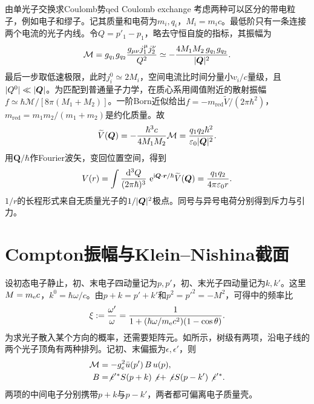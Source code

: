 \begin{example}{由单光子交换求Coulomb势}{qed Coulomb exchange}
    考虑两种可以区分的带电粒子，例如电子和缪子。记其质量和电荷为$m_i,q_i$，$M_i = m_i c$。最低阶只有一条连接两个电流的光子内线。令$Q = p'_1 - p_1$，略去守恒自旋的指标，其振幅为
    \[
        \mathcal M = g_{q_1}g_{q_2}\frac{g_{\mu\nu}j_1^\mu j_2^\nu}{Q^2}
        \simeq -\frac{4M_1M_2\,g_{q_1}g_{q_2}}{\lvert\bm Q\rvert^2}.
    \]
    最后一步取低速极限，此时$j_i^0 \simeq 2M_i$，空间电流比时间分量小$v_i/c$量级，且$|Q^0| \ll \lvert\bm Q\rvert$。为匹配到普通量子力学，在质心系用阈值附近的散射振幅$f \simeq \hbar\mathcal M/[8\pi(M_1 + M_2)]$。一阶Born近似给出$f = -m_\mathrm{red}\widetilde V/(2\pi\hbar^2)$，$m_\mathrm{red} = m_1m_2/(m_1 + m_2)$是约化质量。故
    \[
        \widetilde V(\bm Q) = -\frac{\hbar^3 c}{4M_1M_2}\mathcal M
        = \frac{q_1q_2\hbar^2}{\varepsilon_0\lvert\bm Q\rvert^2}.
    \]
    用$\bm Q/\hbar$作Fourier波矢，变回位置空间，得到
    \[
        V(r) = \int\frac{\mathop{}\!\mathrm{d}^3 Q}{(2\pi\hbar)^3}\,
        \mathop{}\!\mathrm{e}^{\mathrm{i}\bm Q\cdot\bm r/\hbar}\widetilde V(\bm Q)
        = \frac{q_1q_2}{4\pi\varepsilon_0 r}.
    \]
    $1/r$的长程形式来自无质量光子的$1/\lvert\bm Q\rvert^2$极点。同号与异号电荷分别得到斥力与引力。
\end{example}

\section{Compton振幅与Klein--Nishina截面}
\label{sec:qed Compton}

设初态电子静止，初、末电子四动量记为$p,p'$，初、末光子四动量记为$k,k'$。这里$M = m_{\mathrm{e}} c$，$k^0 = \hbar\omega/c$。由$p + k = p' + k'$和$p^2 = p'^2 = -M^2$，可得中的频率比
\begin{equation}
    \label{eq:ed-compton-frequency-ratio}
    \xi := \frac{\omega'}{\omega}
    = \frac{1}{1 + (\hbar\omega/m_{\mathrm{e}} c^2)(1 - \cos\theta)}.
\end{equation}
为求光子散入某个方向的概率，还需要矩阵元。如所示，树级有两项，沿电子线的两个光子顶角有两种排列。记初、末偏振为$\epsilon,\epsilon'$，则
\begin{align}
    \mathcal M &= -g_e^2\bar u(p')\,B\,u(p),\notag\\
    B &= \not{\epsilon}'{}^* S(p + k)\not{\epsilon}
          + \not{\epsilon} S(p - k')\not{\epsilon}'{}^* .
    \label{eq:qed Compton amplitude}
\end{align}
两项的中间电子分别携带$p + k$与$p - k'$，两者都可偏离电子质量壳。

